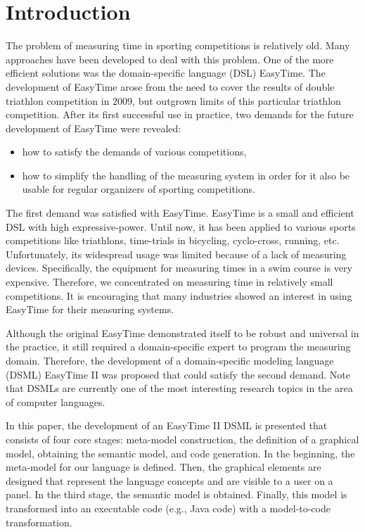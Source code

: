 \documentclass[preprint, prX]{revtex4}
\begin{document}
\section{Introduction}

The problem of measuring time in sporting competitions is relatively old. Many approaches have been developed to deal with this problem. One of the more efficient solutions was the domain-specific language (DSL) \cite{Mernik:2005}\cite{vanDeursen:2000} EasyTime\cite{Fister:2011}. The development of EasyTime arose from the need to cover the results of double triathlon competition in 2009, but outgrown limits of this particular triathlon competition. After its first successful use in practice, two demands for the future development of EasyTime were revealed:
\begin{itemize}
\item how to satisfy the demands of various competitions,
\item how to simplify the handling of the measuring system in order for it also be usable for regular organizers of sporting competitions.
\end{itemize}
The first demand was satisfied with EasyTime. EasyTime is a small and efficient DSL with high expressive-power. Until now, it has been applied to various sports competitions like triathlons, time-trials in bicycling, cyclo-cross, running, etc. Unfortunately, its widespread usage was limited because of a lack of measuring devices. Specifically, the equipment for measuring times in a swim course is very expensive. Therefore, we concentrated on measuring time in relatively small competitions. It is encouraging that many industries showed an interest in using EasyTime for their measuring systems. 

Although the original EasyTime demonstrated itself to be robust and universal in the practice, it still required a domain-specific expert to program the measuring domain. Therefore, the development of a domain-specific modeling language (DSML) EasyTime II was proposed that could satisfy the second demand. Note that DSMLs are currently one of the most interesting research topics in the area of computer languages.  

In this paper, the development of an EasyTime II DSML is presented that consists of four core stages: meta-model construction, the definition of a graphical model, obtaining the semantic model, and code generation. In the beginning, the meta-model for our language is defined. Then, the graphical elements are designed that represent the language concepts and are visible to a user on a panel. In the third stage, the semantic model is obtained. Finally, this model is transformed into an executable code (e.g., Java code) with a model-to-code transformation. 
\end{document}
